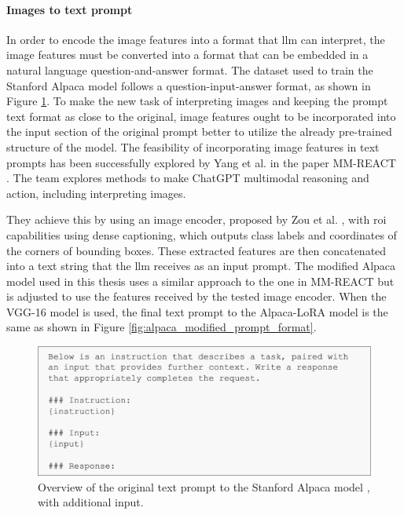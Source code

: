         \paragraph{Images to text prompt\\}
        In order to encode the image features into a format that \gls{llm} can interpret, the image features must be converted into a format that can be embedded in a natural language question-and-answer format. The dataset used to train the Stanford Alpaca model follows a question-input-answer format, as shown in Figure \ref{fig:alpaca_prompt_format}. To make the new task of interpreting images and keeping the prompt text format as close to the original, image features ought to be incorporated into the input section of the original prompt better to utilize the already pre-trained structure of the model. The feasibility of incorporating image features in text prompts has been successfully explored by Yang et al. in the paper MM-REACT \cite{yangMMREACTPromptingChatGPT2023}. The team explores methods to make ChatGPT multimodal reasoning and action, including interpreting images. 
        
        They achieve this by using an image encoder, proposed by Zou et al. \cite{zouGeneralizedDecodingPixel2022}, with \gls{roi} capabilities using dense captioning, which outputs class labels and coordinates of the corners of bounding boxes. These extracted features are then concatenated into a text string that the \gls{llm} receives as an input prompt. The modified Alpaca model used in this thesis uses a similar approach to the one in MM-REACT but is adjusted to use the features received by the tested image encoder. When the VGG-16 model is used, the final text prompt to the Alpaca-LoRA model is the same as shown in Figure \ref{fig:alpaca_modified_prompt_format}.
        
        \begin{figure}[htb]
            \centerline{
            \includegraphics[width=\textwidth]{images/alpaca_prompt_format.png}}
            \caption[Overview of the original text prompt to the Stanford Alpaca model, with additional input.]{Overview of the original text prompt to the Stanford Alpaca model \cite{taoriStanfordCRFM, taoriStanfordAlpacaInstructionfollowing2023}, with additional input.}
            \label{fig:alpaca_prompt_format}
        \end{figure}

